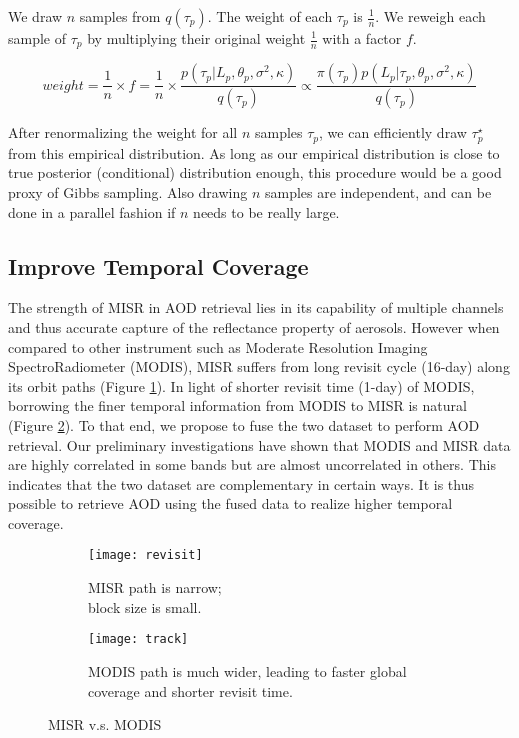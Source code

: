 We draw $n$ samples from $q(\tau_p)$. The weight of each $\tau_p$ is $\frac{1}{n}$. We reweigh each sample of $\tau_p$ by multiplying their original weight $\frac{1}{n}$ with a factor $f$.

\begin{equation}
    weight = \frac{1}{n} \times f = \frac{1}{n} \times \frac{p(\tau_p|L_p,\theta_p,\sigma^2,\kappa)}{q(\tau_p)} \propto \frac{\pi(\tau_p) p(L_p|\tau_p,\theta_p,\sigma^2,\kappa)}{q(\tau_p)}
\end{equation}

After renormalizing the weight for all $n$ samples $\tau_p$, we can efficiently draw $\tau_p^\star$ from this empirical distribution. As long as our empirical distribution is close to true posterior (conditional) distribution enough, this procedure would be a good proxy of Gibbs sampling. Also drawing $n$ samples are independent, and can be done in a parallel fashion if $n$ needs to be really large.

\subsection{Improve Temporal Coverage}
The strength of MISR in AOD retrieval lies in its capability of multiple channels and thus accurate capture of the reflectance property of aerosols. However when compared to other instrument such as Moderate Resolution Imaging SpectroRadiometer (MODIS), MISR suffers from long revisit cycle (16-day) along its orbit paths (Figure \ref{fig:MISR_orbit}). In light of shorter revisit time (1-day) of MODIS, borrowing the finer temporal information from MODIS to MISR is natural (Figure \ref{fig:MISR_MODIS}). To that end, we propose to fuse the two dataset to perform AOD retrieval. Our preliminary investigations have shown that MODIS and MISR data are highly correlated in some bands but are almost uncorrelated in others. This indicates that the two dataset are complementary in certain ways. It is thus possible to retrieve AOD using the fused data to realize higher temporal coverage.

\begin{figure}[h!]
	\centering
	\begin{subfigure}{.45\textwidth}
		\centering
		\texttt{[image: revisit]}
		\caption{MISR path is narrow; \\block size is small.}
		\label{fig:MISR_orbit}
	\end{subfigure}
	\begin{subfigure}{.45\textwidth}
		\centering
		\texttt{[image: track]}
		\caption{MODIS path is much wider, leading to faster global coverage and shorter revisit time.}
		\label{fig:MISR_MODIS}
	\end{subfigure}
	\caption{MISR v.s. MODIS}
	\label{fig:misr}
\end{figure}


